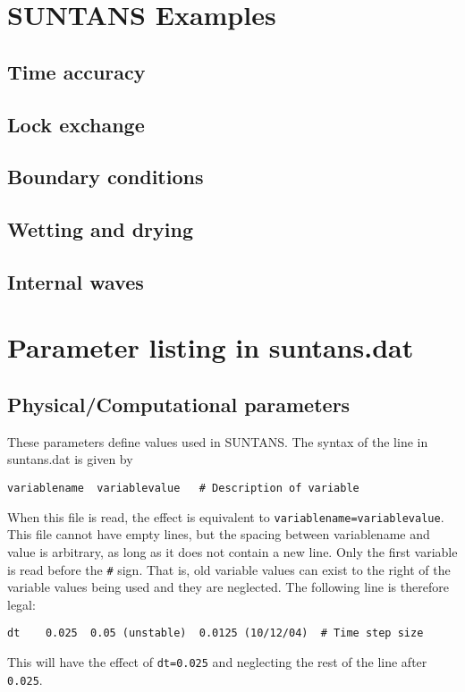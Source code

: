 \documentclass[12pt,oneside]{article}
\begin{document}
\section{SUNTANS Examples} \label{sec:examples}

\subsection{Time accuracy} \label{sec:timeaccuracy}

\subsection{Lock exchange} \label{sec:lockexchange}

\subsection{Boundary conditions} \label{sec:boundary_ex}

\subsection{Wetting and drying} \label{sec:wettinganddrying}

\subsection{Internal waves} \label{sec:internalwaves}

\section{Parameter listing in suntans.dat} \label{sec:params}

\subsection{Physical/Computational parameters}

These parameters define values used in SUNTANS.  The syntax of the line in suntans.dat is given by
\begin{verbatim}
variablename  variablevalue   # Description of variable
\end{verbatim}
When this file is read, the effect is equivalent to \verb+variablename=variablevalue+.
This file cannot have empty lines, but the spacing between variablename and value is arbitrary, as long
as it does not contain a new line.  Only the first variable is read before the \verb+#+ sign.  That is, old variable values can exist to
the right of the variable values being used and they are neglected.  The following line is therefore legal:
\begin{verbatim}
dt    0.025  0.05 (unstable)  0.0125 (10/12/04)  # Time step size
\end{verbatim}
This will have the effect of \verb+dt=0.025+ and neglecting the rest of the line after \verb+0.025+.
\end{document}
